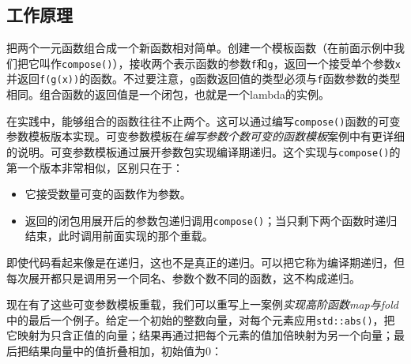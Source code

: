 
\subsection{工作原理}



把两个一元函数组合成一个新函数相对简单。创建一个模板函数（在前面示例中我们把它叫作\texttt{compose()}），接收两个表示函数的参数\texttt{f}和\texttt{g}，返回一个接受单个参数\texttt{x}并返回\texttt{f(\allowbreak{}g(\allowbreak{}x))}的函数。不过要注意，\texttt{g}函数返回值的类型必须与\texttt{f}函数参数的类型相同。组合函数的返回值是一个闭包，也就是一个lambda的实例。



在实践中，能够组合的函数往往不止两个。这可以通过编写\texttt{compose()}函数的可变参数模板版本实现。可变参数模板在\textit{编写参数个数可变的函数模板}案例中有更详细的说明。可变参数模板通过展开参数包实现编译期递归。这个实现与\texttt{compose()}的第一个版本非常相似，区别只在于：



\begin{itemize}
\item 它接受数量可变的函数作为参数。



\item 返回的闭包用展开后的参数包递归调用\texttt{compose()}；当只剩下两个函数时递归结束，此时调用前面实现的那个重载。

\end{itemize}



\begin{myNote}[tip]
即使代码看起来像是在递归，这也不是真正的递归。可以把它称为编译期递归，但每次展开都只是调用另一个同名、参数个数不同的函数，这不构成递归。
\end{myNote}



现在有了这些可变参数模板重载，我们可以重写上一案例\textit{实现高阶函数map与fold}中的最后一个例子。给定一个初始的整数向量，对每个元素应用\texttt{std::\allowbreak{}abs()}，把它映射为只含正值的向量；结果再通过把每个元素的值加倍映射为另一个向量；最后把结果向量中的值折叠相加，初始值为0：



